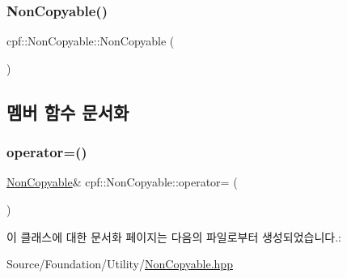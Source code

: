 \subsubsection{\texorpdfstring{Non\+Copyable()}{NonCopyable()}\hspace{0.1cm}{\footnotesize\ttfamily [2/2]}}
{\footnotesize\ttfamily cpf\+::\+Non\+Copyable\+::\+Non\+Copyable (\begin{DoxyParamCaption}\item[{const \hyperlink{classcpf_1_1_non_copyable}{Non\+Copyable} \&}]{ }\end{DoxyParamCaption})\hspace{0.3cm}{\ttfamily [delete]}}



\subsection{멤버 함수 문서화}
\mbox{\label{classcpf_1_1_non_copyable_a2d6fb4d45055443aad6051676509af70}} 
\subsubsection{\texorpdfstring{operator=()}{operator=()}}
{\footnotesize\ttfamily \hyperlink{classcpf_1_1_non_copyable}{Non\+Copyable}\& cpf\+::\+Non\+Copyable\+::operator= (\begin{DoxyParamCaption}\item[{const \hyperlink{classcpf_1_1_non_copyable}{Non\+Copyable} \&}]{ }\end{DoxyParamCaption})\hspace{0.3cm}{\ttfamily [delete]}}



이 클래스에 대한 문서화 페이지는 다음의 파일로부터 생성되었습니다.\+:\begin{DoxyCompactItemize}
\item 
Source/\+Foundation/\+Utility/\hyperlink{_non_copyable_8hpp}{Non\+Copyable.\+hpp}\end{DoxyCompactItemize}
